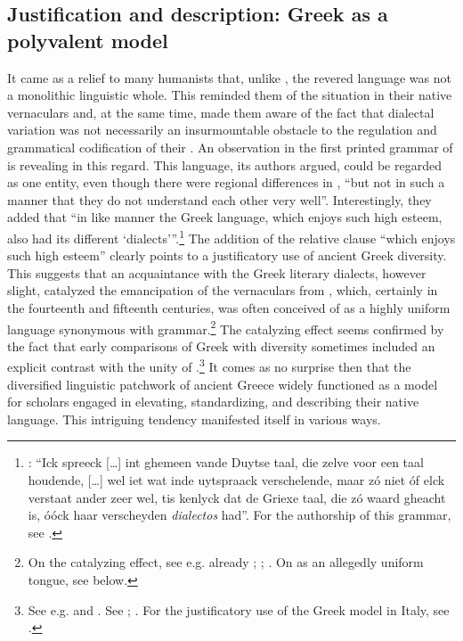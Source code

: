 
\subsection{Justification and description: Greek as a polyvalent model}\label{sec:8.1.2}

It came as a relief to many humanists that, unlike , the revered  language was not a monolithic linguistic whole. This reminded them of the situation in their native vernaculars and, at the same time, made them aware of the fact that dialectal variation was not necessarily an insurmountable obstacle to the regulation and grammatical codification of their . An observation in the first printed grammar of  is revealing in this regard. This language, its authors argued, could be regarded as one entity, even though there were regional differences in , “but not in such a manner that they do not understand each other very well”. Interestingly, they added that “in like manner the Greek language, which enjoys such high esteem, also had its different ‘dialects’”.\footnote{\citet[110]{[spieghel]1584}: “Ick spreeck […] int ghemeen vande Duytse taal, die zelve voor een taal houdende, […] wel iet wat inde uytspraack verschelende, maar zó niet óf elck verstaat ander zeer wel, tis kenlyck dat de Griexe taal, die zó waard gheacht is, óóck haar verscheyden \textit{dialectos} had”. For the authorship of this grammar, see \citet{Peeters1982}.} The addition of the relative clause “which enjoys such high esteem” clearly points to a justificatory use of ancient Greek diversity. This suggests that an acquaintance with the Greek literary dialects, however slight, catalyzed the emancipation of the vernaculars from , which, certainly in the fourteenth and fifteenth centuries, was often conceived of as a highly uniform language synonymous with grammar.\footnote{On the catalyzing effect, see e.g. already \citet[688]{Bonfante1953}; \citet[9]{Trapp1990}; \citet[67]{Rhodes2015}. On  as an allegedly uniform tongue, see  below.} The catalyzing effect seems confirmed by the fact that early comparisons of Greek with  diversity sometimes included an explicit contrast with the unity of .\footnote{See e.g. \citet[\textsc{ii}.41]{Landino1974} and \citet[*.ii\textsc{\textsuperscript{v}}]{Manutius1496Aldus}. See \citet[172--173]{Alinei1984}; \citet[209--210, 215]{Trovato1984}. For the justificatory use of the Greek model in Italy, see \citet[46, 50]{Tavoni1998}.} It comes as no surprise then that the diversified linguistic patchwork of ancient Greece widely functioned as a model for scholars engaged in elevating, standardizing, and describing their native  language. This intriguing tendency manifested itself in various ways.

